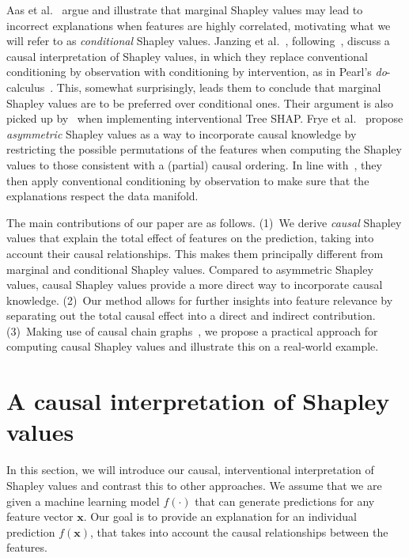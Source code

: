 \documentclass{article}
\newcommand{\vx}{\mathbf{x}}
\begin{document}
Aas et al.~\cite{aas2019explaining} argue and illustrate that marginal Shapley values may lead to incorrect explanations when features are highly correlated, motivating what we will refer to as {\em conditional} Shapley values. Janzing et al.~\cite{janzing2019feature}, following~\cite{datta2016algorithmic}, discuss a causal interpretation of Shapley values, in which they replace conventional conditioning by observation with conditioning by intervention, as in Pearl's {\em do}-calculus~\cite{pearl2012calculus}. This, somewhat surprisingly, leads them to conclude that marginal Shapley values are to be preferred over conditional ones. Their argument is also picked up by~\cite{lundberg2020local} when implementing interventional Tree SHAP. Frye et al.~\cite{frye2019asymmetric} propose {\em asymmetric} Shapley values as a way to incorporate causal knowledge by restricting the possible permutations of the features when computing the Shapley values to those consistent with a (partial) causal ordering. In line with~\cite{aas2019explaining}, they then apply conventional conditioning by observation to make sure that the explanations respect the data manifold.

The main contributions of our paper are as follows.
(1)~We derive {\em causal} Shapley values that explain the total effect of features on the prediction, taking into account their causal relationships. This makes them principally different from marginal and conditional Shapley values. Compared to asymmetric Shapley values, causal Shapley values provide a more direct way to incorporate causal knowledge. (2)~Our method allows for further insights into feature relevance by separating out the total causal effect into a direct and indirect contribution. 
(3)~Making use of causal chain graphs~\cite{lauritzen2002chain}, we propose a practical approach for computing causal Shapley values and illustrate this on a real-world example.

\section{A causal interpretation of Shapley values}
\label{sec:interpretation}

In this section, we will introduce our causal, interventional interpretation of Shapley values and contrast this to other approaches. We assume that we are given a machine learning model $f(\cdot)$ that can generate predictions for any feature vector $\vx$. Our goal is to provide an explanation for an individual prediction $f(\vx)$, that takes into account the causal relationships between the features.
\end{document}
